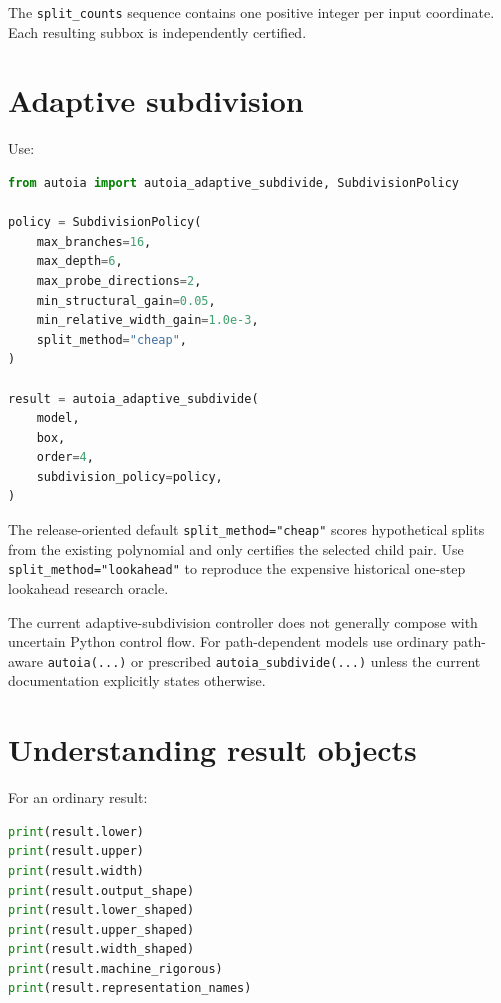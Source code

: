 \documentclass[11pt]{article}
\begin{document}
The \texttt{split\_counts} sequence contains one positive integer per input
coordinate.  Each resulting subbox is independently certified.

\section{Adaptive subdivision}

Use:
\begin{lstlisting}[language=Python]
from autoia import autoia_adaptive_subdivide, SubdivisionPolicy

policy = SubdivisionPolicy(
    max_branches=16,
    max_depth=6,
    max_probe_directions=2,
    min_structural_gain=0.05,
    min_relative_width_gain=1.0e-3,
    split_method="cheap",
)

result = autoia_adaptive_subdivide(
    model,
    box,
    order=4,
    subdivision_policy=policy,
)
\end{lstlisting}

The release-oriented default \texttt{split\_method="cheap"} scores hypothetical
splits from the existing polynomial and only certifies the selected child pair.
Use \texttt{split\_method="lookahead"} to reproduce the expensive historical
one-step lookahead research oracle.

The current adaptive-subdivision controller does not generally compose with
uncertain Python control flow.  For path-dependent models use ordinary path-aware
\texttt{autoia(...)} or prescribed \texttt{autoia\_subdivide(...)} unless the
current documentation explicitly states otherwise.

\section{Understanding result objects}

For an ordinary result:
\begin{lstlisting}[language=Python]
print(result.lower)
print(result.upper)
print(result.width)
print(result.output_shape)
print(result.lower_shaped)
print(result.upper_shaped)
print(result.width_shaped)
print(result.machine_rigorous)
print(result.representation_names)
\end{lstlisting}
\end{document}
